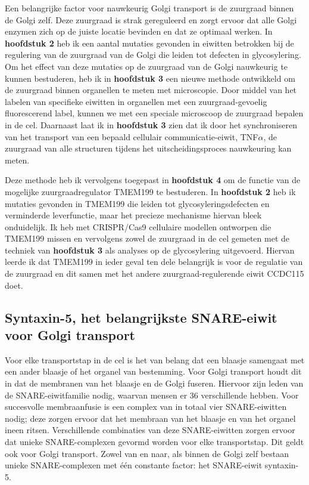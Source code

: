 Een belangrijke factor voor nauwkeurig Golgi transport is de zuurgraad binnen de Golgi zelf. Deze zuurgraad is strak gereguleerd en zorgt ervoor dat alle Golgi enzymen zich op de juiste locatie bevinden en dat ze optimaal werken. In \textbf{hoofdstuk 2} heb ik een aantal mutaties gevonden in eiwitten betrokken bij de regulering van de zuurgraad van de Golgi die leiden tot defecten in glycosylering. Om het effect van deze mutaties op de zuurgraad van de Golgi nauwkeurig te kunnen bestuderen, heb ik in \textbf{hoofdstuk 3} een nieuwe methode ontwikkeld om de zuurgraad binnen organellen te meten met microscopie. Door middel van het labelen van specifieke eiwitten in organellen met een zuurgraad-gevoelig fluorescerend label, kunnen we met een speciale microscoop de zuurgraad bepalen in de cel. Daarnaast laat ik in \textbf{hoofdstuk 3} zien dat ik door het synchroniseren van het transport van een bepaald cellulair communicatie-eiwit, TNF$\alpha$, de zuurgraad van alle structuren tijdens het uitscheidingsproces nauwkeuring kan meten.

Deze methode heb ik vervolgens toegepast in \textbf{hoofdstuk 4} om de functie van de mogelijke zuurgraadregulator TMEM199 te bestuderen. In \textbf{hoofdstuk 2} heb ik mutaties gevonden in TMEM199 die leiden tot glycosyleringsdefecten en verminderde leverfunctie, maar het precieze mechanisme hiervan bleek onduidelijk. Ik heb met CRISPR/Cas9 cellulaire modellen ontworpen die TMEM199 missen en vervolgens zowel de zuurgraad in de cel gemeten met de techniek van \textbf{hoofdstuk 3} als analyses op de glycosylering uitgevoerd. Hiervan leerde ik dat TMEM199 in ieder geval ten dele belangrijk is voor de regulatie van de zuurgraad en dit samen met het andere zuurgraad-regulerende eiwit CCDC115 doet.

\subsection{Syntaxin-5, het belangrijkste SNARE-eiwit voor Golgi transport}

Voor elke transportstap in de cel is het van belang dat een blaasje samengaat met een ander blaasje of het organel van bestemming. Voor Golgi transport houdt dit in dat de membranen van het blaasje en de Golgi fuseren. Hiervoor zijn leden van de SNARE-eiwitfamilie nodig, waarvan mensen er 36 verschillende hebben. Voor succesvolle membraanfusie is een complex van in totaal vier SNARE-eiwitten nodig; deze zorgen ervoor dat het membraan van het blaasje en van het organel ineen ritsen. Verschillende combinaties van deze SNARE-eiwitten zorgen ervoor dat unieke SNARE-complexen gevormd worden voor elke transportstap. Dit geldt ook voor Golgi transport. Zowel van en naar, als binnen de Golgi zelf bestaan unieke SNARE-complexen met één constante factor: het SNARE-eiwit syntaxin-5.

